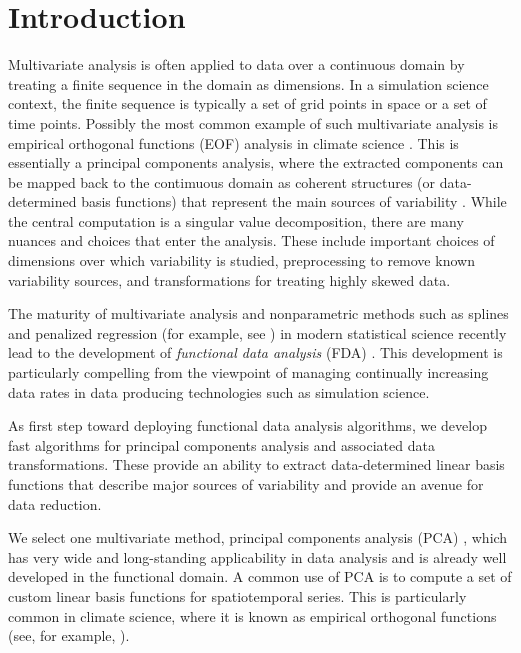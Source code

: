 \section{Introduction}
\label{sec:intro}
Multivariate analysis is often applied to data over a continuous
domain by treating a finite sequence in the domain as dimensions. In a
simulation science context, the finite sequence is typically a set of
grid points in space or a set of time points. Possibly the most common
example of such multivariate analysis is empirical orthogonal
functions (EOF) analysis in climate science
\cite{Storch2001,Wackernagel2003,PutmanEtAl00Downscaling}. This is
essentially a principal components analysis, where the extracted
components can be mapped back to the contimuous domain as coherent
structures (or data-determined basis functions) that represent the
main sources of variability \cite{Jolliffe2002}. While the central
computation is a singular value decomposition, there are many nuances
and choices that enter the analysis. These include important choices
of dimensions over which variability is studied, preprocessing to
remove known variability sources, and transformations for treating
highly skewed data.

The maturity of multivariate analysis and nonparametric methods such as
splines and penalized regression (for example, see
\cite{Wasserman2006,Hastie2009}) in modern statistical science
recently lead to the development of {\em functional data analysis}
(FDA) \cite{Ramsey2005,Ferraty2006,Ramsey2009,Hsing2015}.  This
development is particularly compelling from the viewpoint of managing
continually increasing data rates in data producing technologies such
as simulation science. 

As first step toward deploying functional data analysis algorithms, we
develop fast algorithms for principal components analysis and
associated data transformations. These provide an ability to extract
data-determined linear basis functions that describe major sources of
variability and provide an avenue for data reduction.

We select one multivariate method, principal components analysis
(PCA) \cite{Jolliffe2002}, which has very wide and long-standing
applicability in data analysis and is already well developed in the
functional domain. A common use of PCA is to compute a set of custom
linear basis functions for spatiotemporal series. This is particularly
common in climate science, where it is known as empirical orthogonal
functions (see, for example, \cite{JOC2007}).


